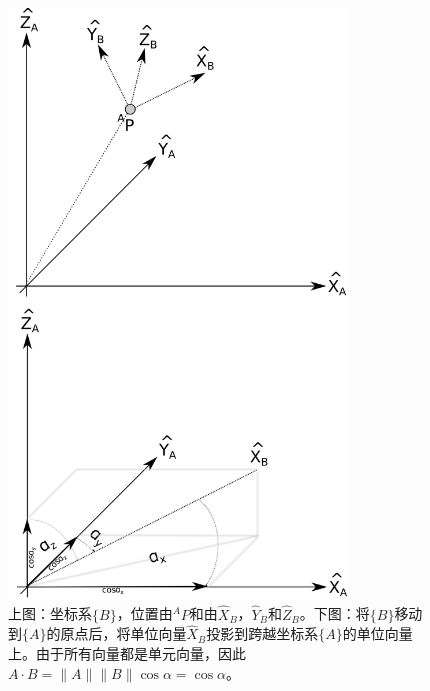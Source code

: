 \begin{figure}
	\centering
	\includegraphics[width=0.8\textwidth]{figs/projection.png}
	\caption{上图：坐标系$\{B\}$，位置由$^AP$和由$\hat{X}_B$，$\hat{Y}_B$和$\hat{Z}_B$。下图：将$\{B\}$移动到$\{A\}$的原点后，将单位向量$\hat{X}_B$投影到跨越坐标系$\{A\}$的单位向量上。由于所有向量都是单元向量，因此$A\cdot B=\|A\|\|B\|\cos\alpha=\cos\alpha$。}
	\label{fig:projection}
\end{figure}


